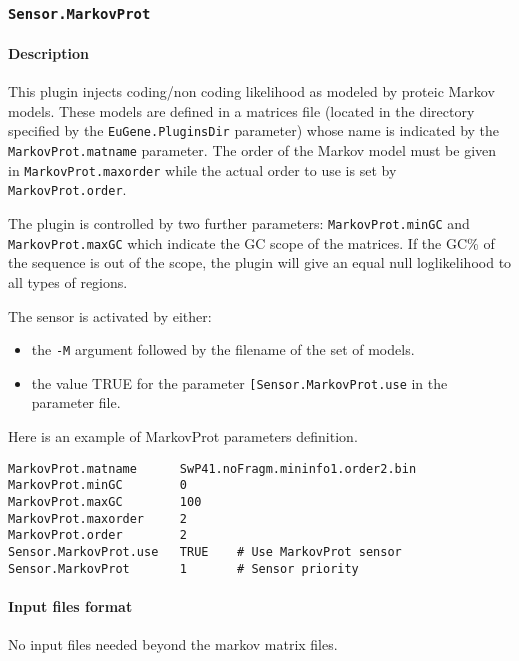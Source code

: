 
\subsubsection{\texttt{Sensor.MarkovProt}}

\paragraph{Description}

This plugin injects coding/non coding likelihood as modeled by proteic
Markov models. These models are defined in a matrices file (located in
the directory specified by the \texttt{EuGene.PluginsDir} parameter)
whose name is indicated by the \texttt{MarkovProt.matname} parameter.
The order of the Markov model must be given in
\texttt{MarkovProt.maxorder} while the actual order to use is set by
\texttt{MarkovProt.order}.

The plugin is controlled by two further parameters:
\texttt{MarkovProt.minGC} and \texttt{MarkovProt.maxGC} which indicate
the GC scope of the matrices. If the GC\% of the sequence is out of
the scope, the plugin will give an equal null loglikelihood to all types
of regions.


The sensor is activated by either:
\begin{itemize}
\item the \texttt{-M} argument followed by the filename of the set of models.
\item the value TRUE for the parameter \texttt{[Sensor.MarkovProt.use} in
  the parameter file.
\end{itemize}

Here is an example of MarkovProt parameters definition.
\begin{Verbatim}[fontsize=\small]
MarkovProt.matname      SwP41.noFragm.mininfo1.order2.bin
MarkovProt.minGC        0
MarkovProt.maxGC        100
MarkovProt.maxorder     2
MarkovProt.order        2
Sensor.MarkovProt.use   TRUE    # Use MarkovProt sensor
Sensor.MarkovProt       1       # Sensor priority
\end{Verbatim}

\paragraph{Input files format}

No input files  needed beyond the markov matrix files.

